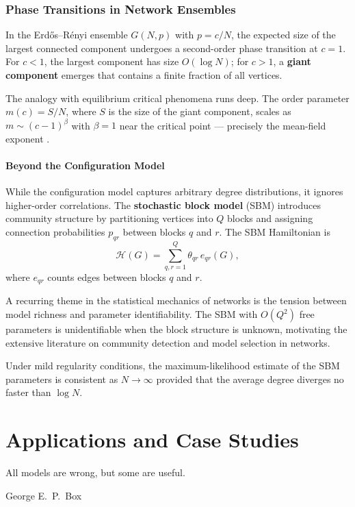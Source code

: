 \section{Phase Transitions in Network Ensembles}

\begin{theorem}\label{thm:percolation}
In the Erd\H{o}s--R\'{e}nyi ensemble $G(N,p)$ with $p = c/N$, the expected size of the largest connected component undergoes a second-order phase transition at $c = 1$. For $c < 1$, the largest component has size $O(\log N)$; for $c > 1$, a \textbf{giant component} emerges that contains a finite fraction of all vertices.
\end{theorem}

The analogy with equilibrium critical phenomena runs deep. The order parameter $m(c) = S/N$, where $S$ is the size of the giant component, scales as $m \sim (c - 1)^{\beta}$ with $\beta = 1$ near the critical point --- precisely the mean-field exponent .

\subsection{Beyond the Configuration Model}

While the configuration model captures arbitrary degree distributions, it ignores higher-order correlations. The \textbf{stochastic block model} (SBM) introduces community structure by partitioning vertices into $Q$ blocks and assigning connection probabilities $p_{qr}$ between blocks $q$ and $r$. The SBM Hamiltonian is
\[
\mathcal{H}(G) = \sum_{q,r=1}^{Q} \theta_{qr}\, e_{qr}(G),
\]
where $e_{qr}$ counts edges between blocks $q$ and $r$.

\begin{remark}[Identifiability]
A recurring theme in the statistical mechanics of networks is the tension between model richness and parameter identifiability. The SBM with $O(Q^2)$ free parameters is unidentifiable when the block structure is unknown, motivating the extensive literature on community detection and model selection in networks.
\end{remark}

\begin{corollary}
Under mild regularity conditions, the maximum-likelihood estimate of the SBM parameters is consistent as $N \to \infty$ provided that the average degree diverges no faster than $\log N$.
\end{corollary}

\part{Applications and Case Studies}
\epigraph{All models are wrong, but some are useful.}{George E.\ P.\ Box}

